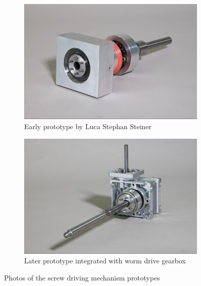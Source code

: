\begin{figure}[!h]
    \centering
    \begin{subfigure}[b]{0.49\textwidth}
        \centering
        \includegraphics[width=\textwidth]{images/7a/img34.jpg}
        \caption{Early prototype by Luca Stephan Steiner}
        \label{fig:luca-prototype}
    \end{subfigure}
    \hfill
    \begin{subfigure}[b]{0.49\textwidth}
        \centering
        \includegraphics[width=\textwidth]{images/7a/img35.jpg}
        \caption{Later prototype integrated with worm drive gearbox}
        \label{fig:later-prototype}
    \end{subfigure}
    \caption{Photos of the screw driving mechanism prototypes}
    \label{fig:photos-of-the-screw-driving-mechanism-prototypes}
\end{figure}

